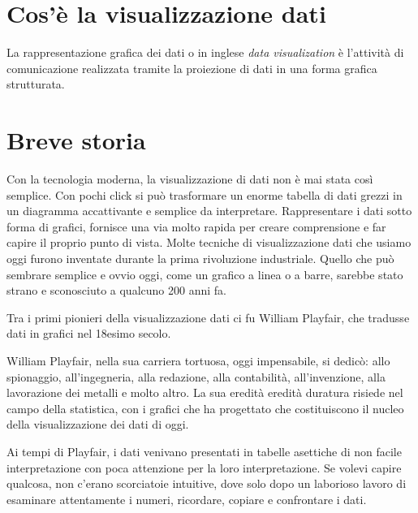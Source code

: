 \setlength{\parskip}{1em}

\section{Cos'è la visualizzazione dati }
La rappresentazione grafica dei dati o in inglese \emph{data visualization} è l’attività di comunicazione realizzata tramite la proiezione di dati in una forma grafica strutturata.

\section{Breve storia}

Con la tecnologia moderna, la visualizzazione di dati non è mai stata così semplice.
Con pochi click si può trasformare un enorme tabella di dati grezzi in un diagramma accattivante e semplice da interpretare. Rappresentare i dati sotto forma di grafici, fornisce una via molto rapida per creare comprensione e far capire il proprio punto di vista.
Molte tecniche di visualizzazione dati che usiamo oggi furono inventate durante la prima rivoluzione industriale.
Quello che può sembrare semplice e ovvio oggi, come un grafico a linea o a barre,  sarebbe stato strano e sconosciuto a qualcuno 200 anni fa.


Tra i primi pionieri della visualizzazione dati ci fu William Playfair, che tradusse dati in grafici nel 18esimo secolo. 

William Playfair, nella sua carriera tortuosa, oggi impensabile, si dedicò: allo spionaggio, all’ingegneria, alla redazione, alla contabilità, all’invenzione, alla lavorazione dei metalli e molto altro. La sua eredità eredità duratura risiede nel campo della statistica, con i grafici che ha progettato che costituiscono il nucleo della visualizzazione dei dati di oggi.

Ai tempi di Playfair, i dati venivano presentati in tabelle asettiche di non facile interpretazione con poca attenzione per la loro interpretazione. Se volevi capire qualcosa, non c’erano scorciatoie intuitive, dove solo dopo un laborioso lavoro di esaminare attentamente i numeri, ricordare, copiare e confrontare i dati.

